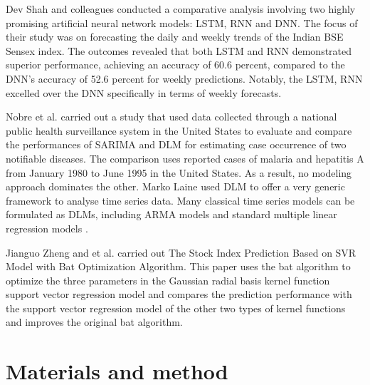 \documentclass{ieeeojies}
\begin{document}
Dev Shah and colleagues \cite{comparednn} conducted a comparative analysis involving two highly promising artificial neural network models: LSTM, RNN and DNN. The focus of their study was on forecasting the daily and weekly trends of the Indian BSE Sensex index. The outcomes revealed that both LSTM and RNN demonstrated superior performance, achieving an accuracy of 60.6 percent, compared to the DNN's accuracy of 52.6 percent for weekly predictions. Notably, the LSTM, RNN excelled over the DNN specifically in terms of weekly forecasts.

Nobre et al. \cite{2} carried out a study that used data collected through a national public health surveillance system in the United States to evaluate and compare the performances of SARIMA and DLM for estimating case occurrence of two notifiable diseases. The comparison uses reported cases of malaria and hepatitis A from January 1980 to June 1995 in the United States. As a result, no modeling approach dominates the other. Marko Laine used DLM to offer a very generic framework to analyse time series data. Many classical time series models can be formulated as DLMs, including ARMA models and standard multiple linear regression models \cite{3}.

Jianguo Zheng and et al. \cite{4} carried out The Stock Index Prediction Based on SVR Model with Bat Optimization Algorithm. This paper uses the bat algorithm to optimize the three parameters in the Gaussian radial basis kernel function support vector regression model and compares the prediction performance with the support vector regression model of the other two types of kernel functions and improves the original bat algorithm.

\section{Materials and method}
\end{document}
